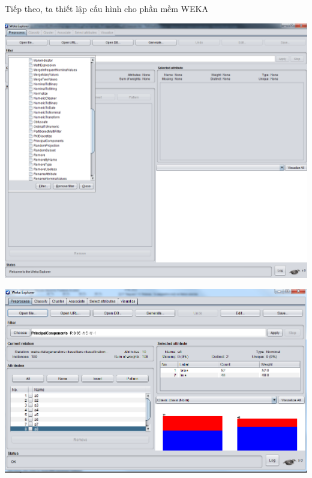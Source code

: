 \documentclass{hcmutarticle}
\begin{document}
Tiếp theo, ta thiết lập cấu hình cho phần mềm WEKA
\begin{center}
	\includegraphics[scale=0.5]{image/step1.png}
\end{center}

\begin{center}
	\includegraphics[scale=0.6]{image/pca_1.png}
\end{center}
\end{document}

